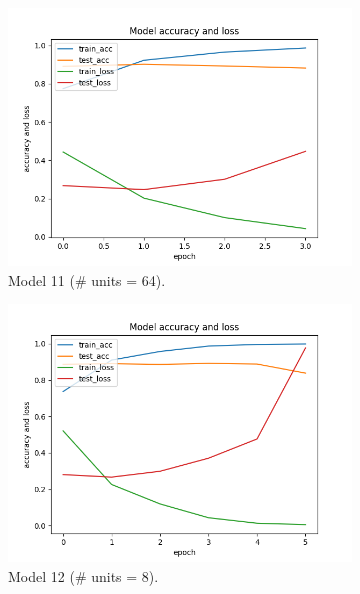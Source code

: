 \documentclass[11pt]{article}
\begin{document}
\begin{figure}[h!]
\begin{subfigure}{0.32\textwidth}
         \centering
         \includegraphics[width=\textwidth]{model11.png}
         \caption{Model 11 (\# units = 64).}
         \label{fig:model11}
\end{subfigure}
%
\begin{subfigure}{0.32\textwidth}
         \centering
         \includegraphics[width=\textwidth]{model12.png}
         \caption{Model 12 (\# units = 8).}
         \label{fig:model12}
\end{subfigure}
\hfill
\begin{subfigure}{0.32\textwidth}
         \centering

\end{subfigure}
\end{figure}
\end{document}
